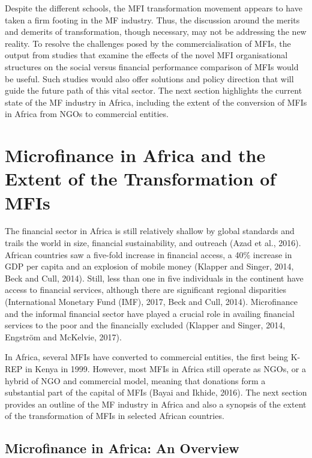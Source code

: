 \documentclass[a4paper, nobind]{templates/ociamthesis}
\begin{document}
Despite the different schools, the MFI transformation movement appears to have taken a firm footing in the MF industry. Thus, the discussion around the merits and demerits of transformation, though necessary, may not be addressing the new reality. To resolve the challenges posed by the commercialisation of MFIs, the output from studies that examine the effects of the novel MFI organisational structures on the social versus financial performance comparison of MFIs would be useful. Such studies would also offer solutions and policy direction that will guide the future path of this vital sector. The next section highlights the current state of the MF industry in Africa, including the extent of the conversion of MFIs in Africa from NGOs to commercial entities.

\hypertarget{microfinance-in-africa-and-the-extent-of-the-transformation-of-mfis}{%
\section{Microfinance in Africa and the Extent of the Transformation of MFIs}\label{microfinance-in-africa-and-the-extent-of-the-transformation-of-mfis}}

\noindent The financial sector in Africa is still relatively shallow by global standards and trails the world in size, financial sustainability, and outreach (Azad et al., 2016). African countries saw a five-fold increase in financial access, a 40\% increase in GDP per capita and an explosion of mobile money (Klapper and Singer, 2014, Beck and Cull, 2014). Still, less than one in five individuals in the continent have access to financial services, although there are significant regional disparities (International Monetary Fund (IMF), 2017, Beck and Cull, 2014). Microfinance and the informal financial sector have played a crucial role in availing financial services to the poor and the financially excluded (Klapper and Singer, 2014, Engström and McKelvie, 2017).

In Africa, several MFIs have converted to commercial entities, the first being K-REP in Kenya in 1999. However, most MFIs in Africa still operate as NGOs, or a hybrid of NGO and commercial model, meaning that donations form a substantial part of the capital of MFIs (Bayai and Ikhide, 2016). The next section provides an outline of the MF industry in Africa and also a synopsis of the extent of the transformation of MFIs in selected African countries.

\hypertarget{microfinance-in-africa-an-overview}{%
\subsection{Microfinance in Africa: An Overview}\label{microfinance-in-africa-an-overview}}
\end{document}
